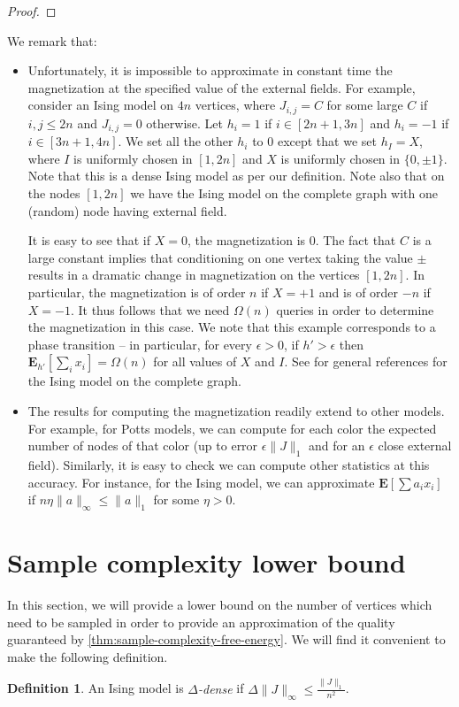 \documentclass[final, 12pt]{colt2018}
\newtheorem{defn}[theorem]{Definition}
\theoremstyle{definition}
\newtheorem{defn}[theorem]{Definition}
\theoremstyle{plain}
\begin{document}
\begin{proof}
\end{proof}

We remark that: 
\begin{itemize}
\item Unfortunately, it is impossible to approximate in constant time the magnetization at the specified value of the external fields. For example, consider an Ising model on $4 n$ vertices, where 
$J_{i,j} = C$ for some large $C$ if $i,j \leq 2n$ and $J_{i,j} = 0$ otherwise. 
Let $h_i = 1$ if $i \in [2n+1,3n]$ and $h_i = -1$ if $i \in [3n+1,4n]$.
We set all the other $h_i$ to $0$ except that we set $h_I = X$, where 
$I$ is uniformly chosen in $[1,2n]$ and $X$ is uniformly chosen in $\{0,\pm 1\}$. Note that this is a dense Ising model as per our definition. Note also that on the nodes $[1,2n]$ we have the Ising model on the complete graph with one (random) node having external field.

It is easy to see that if $X = 0$, the magnetization is $0$. 
The fact that $C$ is a large constant implies that conditioning on one vertex taking the value $\pm$ results in a dramatic change in magnetization on the vertices $[1,2n]$. In particular, the magnetization is of order $n$ if $X = +1$ and is of order $-n$ if $X = -1$. 
It thus follows that we need $\Omega(n)$ queries in order to determine the magnetization in this case. 
We note that this example corresponds to a phase transition -- in particular, for every $\epsilon > 0$, if 
$h' > \epsilon$ then $\boldsymbol{E}_{h'}[\sum_{i}x_{i}] = \Omega(n)$ for all values of $X$ and $I$. 
See \citep{ellis2007entropy} for general references for the Ising model on the complete graph.  


\item The results for computing the magnetization readily extend to other models. 
For example, for Potts models, we can compute for each color the expected number of nodes of that color 
(up to error $\epsilon \| J \|_1$ and for an $\epsilon$ close external field). 
Similarly, it is easy to check we can compute other statistics at this accuracy. For instance, for the Ising model, we can approximate $\boldsymbol{E}[\sum a_i x_i]$ if $n \eta \|a\|_{\infty} \leq \| a \|_1$ for some $\eta > 0$.

\end{itemize}




\section{Sample complexity lower bound}
In this section, we will provide a lower bound on the number of vertices which need to be sampled in order to provide an approximation of the quality guaranteed by \cref{thm:sample-complexity-free-energy}. We will find it convenient to make the following definition.
\begin{defn}
An Ising model is \emph{$\Delta$-dense} if $\Delta \|J\|_{\infty} \leq \frac{\|J\|_1}{n^2}$.
\end{defn}
\end{document}
